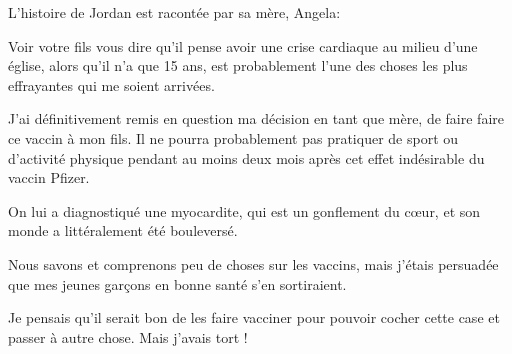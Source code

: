 L'histoire de Jordan est racontée par sa mère, Angela:

Voir votre fils vous dire qu'il pense avoir une crise cardiaque au milieu d'une
église, alors qu'il n'a que 15 ans, est probablement l'une des choses les plus
effrayantes qui me soient arrivées.

J'ai définitivement remis en question ma décision en tant que mère, de faire
faire ce vaccin à mon fils. Il ne pourra probablement pas pratiquer de sport ou
d'activité physique pendant au moins deux mois après cet effet indésirable du
vaccin Pfizer.

On lui a diagnostiqué une myocardite, qui est un gonflement du cœur, et son
monde a littéralement été bouleversé.

Nous savons et comprenons peu de choses sur les vaccins, mais j'étais persuadée
que mes jeunes garçons en bonne santé s'en sortiraient.

Je pensais qu'il serait bon de les faire vacciner pour pouvoir cocher cette case
et passer à autre chose. Mais j'avais tort !

